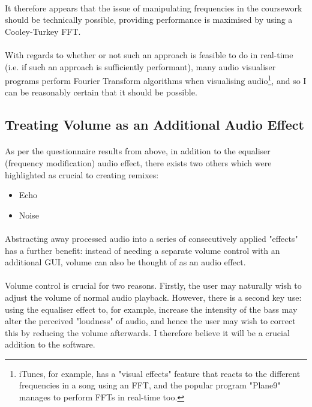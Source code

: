 \paragraph{}
It therefore appears that the issue of manipulating frequencies in the coursework should be technically possible, providing performance is maximised by using a Cooley-Turkey FFT.

\paragraph{}
With regards to whether or not such an approach is feasible to do in real-time (i.e. if such an approach is sufficiently performant), many audio visualiser programs perform Fourier Transform algorithms when visualising audio\footnote{
	iTunes, for example, has a "visual effects" feature that reacts to the different frequencies in a song using an FFT, and the popular program "Plane9" manages to perform FFTs in real-time too.
},  and so I can be reasonably certain that it should be possible.

\pagebreak
\subsection{Treating Volume as an Additional Audio Effect}
\paragraph{}
As per the questionnaire results from above, in addition to the equaliser (frequency modification) audio effect, there exists two others which were highlighted as crucial to creating remixes:
\begin{itemize}
	\item Echo
	\item Noise
\end{itemize}

\paragraph{}
Abstracting away processed audio into a series of consecutively applied "effects" has a further benefit: instead of needing a separate volume control with an additional GUI, volume can also be thought of as an audio effect.

\paragraph{}
Volume control is crucial for two reasons. Firstly, the user may naturally wish to adjust the volume of normal audio playback. However, there is a second key use: using the equaliser effect to, for example, increase the intensity of the bass may alter the perceived "loudness" of audio, and hence the user may wish to correct this by reducing the volume afterwards. I therefore believe it will be a crucial addition to the software.

